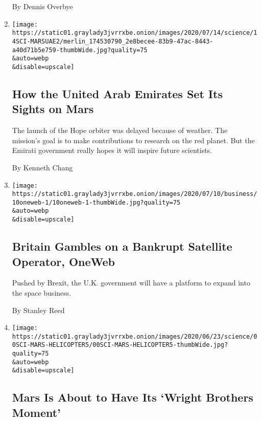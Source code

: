 \begin{enumerate}
  By Dennis Overbye
\item
  \href{/2020/07/14/science/mars-united-arab-emirates.html}{}

  \texttt{[image: https://static01.graylady3jvrrxbe.onion/images/2020/07/14/science/14SCI-MARSUAE2/merlin\_174530790\_2e8becee-83b9-47ac-8443-a40d71b5e759-thumbWide.jpg?quality=75\\\&auto=webp\\\&disable=upscale]}

  \hypertarget{how-the-united-arab-emirates-set-its-sights-on-mars}{%
  \subsection{How the United Arab Emirates Set Its Sights on
  Mars}\label{how-the-united-arab-emirates-set-its-sights-on-mars}}

  The launch of the Hope orbiter was delayed because of weather. The
  mission's goal is to make contributions to research on the red planet.
  But the Emirati government really hopes it will inspire future
  scientists.

  By Kenneth Chang
\item
  \href{/2020/07/10/business/britain-oneweb.html}{}

  \texttt{[image: https://static01.graylady3jvrrxbe.onion/images/2020/07/10/business/10oneweb-1/10oneweb-1-thumbWide.jpg?quality=75\\\&auto=webp\\\&disable=upscale]}

  \hypertarget{britain-gambles-on-a-bankrupt-satellite-operator-oneweb}{%
  \subsection{Britain Gambles on a Bankrupt Satellite Operator,
  OneWeb}\label{britain-gambles-on-a-bankrupt-satellite-operator-oneweb}}

  Pushed by Brexit, the U.K. government will have a platform to expand
  into the space business.

  By Stanley Reed
\item
  \href{/2020/06/23/science/mars-helicopter-nasa.html}{}

  \texttt{[image: https://static01.graylady3jvrrxbe.onion/images/2020/06/23/science/00SCI-MARS-HELICOPTER5/00SCI-MARS-HELICOPTER5-thumbWide.jpg?quality=75\\\&auto=webp\\\&disable=upscale]}

  \hypertarget{mars-is-about-to-have-its-wright-brothers-moment}{%
  \subsection{Mars Is About to Have Its `Wright Brothers
  Moment'}\label{mars-is-about-to-have-its-wright-brothers-moment}}


\end{enumerate}
